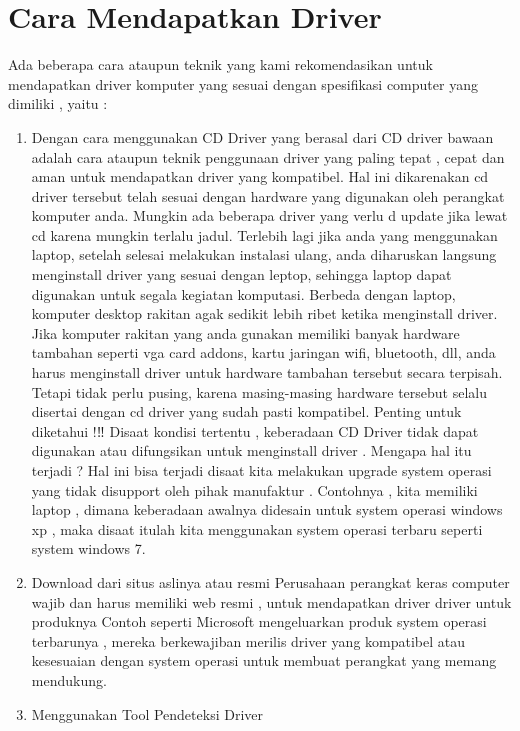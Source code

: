 \section{Cara Mendapatkan Driver}
Ada beberapa cara ataupun teknik yang kami rekomendasikan untuk mendapatkan driver komputer yang sesuai dengan spesifikasi computer yang dimiliki , yaitu :
\begin{enumerate}
\item Dengan cara menggunakan CD 
Driver yang berasal dari CD driver bawaan adalah cara ataupun teknik penggunaan driver yang paling tepat , cepat dan aman untuk mendapatkan driver yang kompatibel.
Hal ini dikarenakan cd driver tersebut telah sesuai dengan hardware yang digunakan oleh perangkat komputer anda. 
Mungkin ada beberapa driver yang verlu d update jika lewat cd karena mungkin terlalu jadul.
Terlebih lagi jika anda yang menggunakan laptop, setelah selesai melakukan instalasi ulang, anda diharuskan langsung menginstall driver yang sesuai dengan leptop, sehingga laptop dapat digunakan untuk segala kegiatan komputasi.
Berbeda dengan laptop, komputer desktop rakitan agak sedikit lebih ribet ketika menginstall driver.
Jika komputer rakitan yang anda gunakan memiliki banyak hardware tambahan seperti vga card addons, kartu jaringan wifi, bluetooth, dll, anda harus menginstall driver untuk hardware tambahan tersebut secara terpisah.
Tetapi tidak perlu pusing, karena masing-masing hardware tersebut selalu disertai dengan cd driver yang sudah pasti kompatibel.
Penting untuk diketahui !‼
Disaat kondisi tertentu  , keberadaan CD Driver tidak dapat digunakan atau difungsikan untuk menginstall driver . Mengapa hal itu terjadi ? Hal ini bisa terjadi disaat kita melakukan upgrade system operasi yang tidak disupport oleh pihak manufaktur . Contohnya , kita memiliki laptop , dimana keberadaan awalnya didesain untuk system operasi windows xp , maka disaat itulah kita menggunakan system operasi terbaru seperti system windows 7.

\item Download dari situs aslinya atau resmi
Perusahaan perangkat keras computer wajib dan harus memiliki web resmi , untuk mendapatkan driver driver untuk produknya
Contoh seperti Microsoft mengeluarkan produk system operasi terbarunya , mereka berkewajiban merilis driver yang kompatibel atau kesesuaian dengan system operasi untuk membuat perangkat yang memang mendukung.

\item Menggunakan Tool Pendeteksi Driver 
\end{enumerate}

